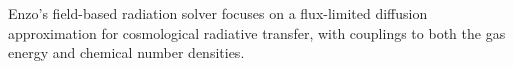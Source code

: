 Enzo's field-based radiation solver focuses on
a flux-limited diffusion approximation for cosmological radiative
transfer, with couplings to both the gas energy and chemical number
densities.

